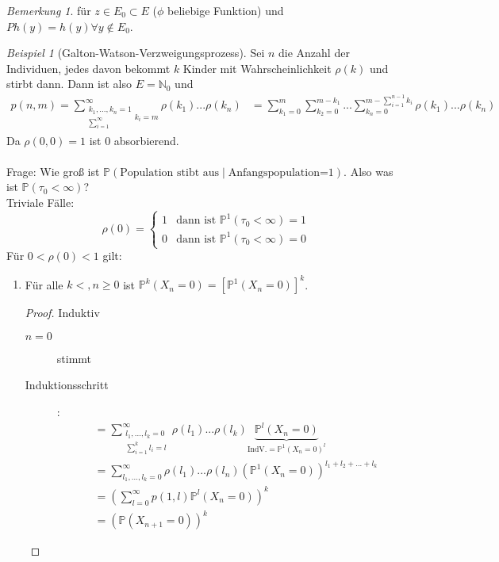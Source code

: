 \documentclass[10pt,a4paper]{article}
\newcommand{\N}{\ensuremath{\mathbb{N}}}
\newcommand{\Prb}{\mathbb P}
\theoremstyle{plain}
\theoremstyle{definition}
\theoremstyle{remark}
\newtheorem{bem}[theorem]{Bemerkung}
\newtheorem{exm}[theorem]{Beispiel}
\begin{document}
	\begin{bem}
		für $z\in E_0\subset E$ ($\phi$ beliebige Funktion) und $Ph(y)=h(y)\forall y\notin E_0$. 
	\end{bem}
	
	\begin{exm}[Galton-Watson-Verzweigungsprozess]
		Sei $n$ die Anzahl der Individuen, jedes davon bekommt $k$ Kinder mit Wahrscheinlichkeit $\rho(k)$ und stirbt dann.
		Dann ist also $E=\N_0$ und
		\begin{align*}
		p(n,m)=\sum_{\substack{k_1,...,k_n=1\\\sum_{i=1}^\infty}k_i=m}^{\infty}\rho(k_1)...\rho(k_n)&=\sum_{k_1=0}^{m}\sum_{k_2=0}^{m-k_1}...\sum_{k_n=0}^{m-\sum_{i=1}^{n-1}k_i}\rho(k_1)...\rho(k_n)
		\end{align*}
		Da $\rho(0,0)=1$ ist $0$ absorbierend.\\
		\\
		Frage: Wie groß ist $\Prb(\text{Population stibt aus}\mid\text{Anfangspopulation=1})$. Also was ist $\Prb(\tau_0<\infty)$?\\
		Triviale Fälle:
		\[\rho(0)=\begin{cases}
		1&\text{dann ist }\Prb^1(\tau_0<\infty)=1\\
		0&\text{dann ist }\Prb^1(\tau_0<\infty)=0
		\end{cases}\]
		Für $0<\rho(0)<1$ gilt:
		\begin{enumerate}
			\item Für alle $k<,n\geq 0$ ist $\Prb^k(X_n=0)=\left[\Prb^1(X_n=0)\right]^k$.
			\begin{proof}Induktiv
				\begin{description}
					\item[$n=0$] stimmt
					\item[Induktionsschritt]:
					\begin{align*}
					&=\sum_{\substack{l_1,...,l_k=0\\\sum_{i=1}^{k}l_i=l}}^{\infty}\rho(l_1)...\rho(l_k)\underbrace{\Prb^l(X_n=0)}_{\text{IndV.}=\Prb^1(X_n=0)^l}\\
					&=\sum_{l_1,...,l_k=0}^{\infty}\rho(l_1)...\rho(l_n)\left(\Prb^1(X_n=0)\right)^{l_1+l_2+...+l_k}\\
					&=\left(\sum_{l=0}^{\infty}p(1,l)\Prb^l(X_n=0)\right)^k\\
					&=\left(\Prb(X_{n+1}=0)\right)^k
					\end{align*}
				\end{description}

\end{proof}
\end{enumerate}
\end{exm}
\end{document}
